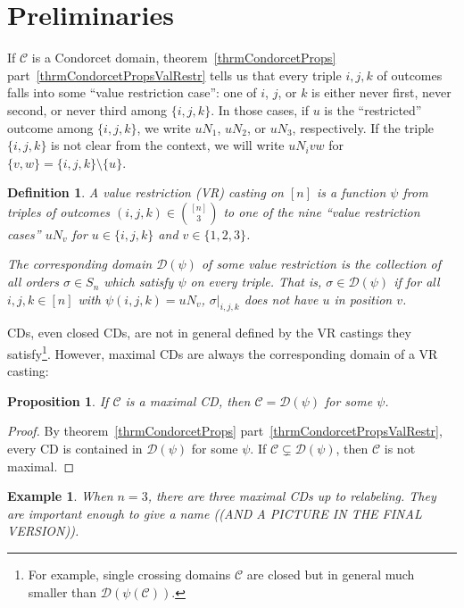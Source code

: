 \documentclass[12pt]{article}
\newtheorem{definition}[theorem]{Definition}
\newtheorem{example}[theorem]{Example}
\newtheorem{proposition}[theorem]{Proposition}
\newcommand{\C}{\mathcal{C}}
\newcommand{\D}{\mathcal{D}}
\newcommand{\1}[1]{\mathds{1}[{#1}]}
\begin{document}
\section{Preliminaries}

  If $\C$ is a Condorcet domain, theorem~\ref{thrmCondorcetProps}
  part~\ref{thrmCondorcetPropsValRestr} tells us that every triple $i,j,k$
  of outcomes falls into some ``value restriction case'':
  one of $i$, $j$, or $k$ is either
  never first, never second, or never third among $\{i,j,k\}$.
  In those cases, if $u$ is the ``restricted'' outcome among $\{i,j,k\}$,
  we write $u N_1$, $u N_2$, or $u N_3$, respectively.
  If the triple $\{i,j,k\}$ is not clear from the context, we will write
  $u N_i vw$ for $\{v,w\} = \{i,j,k\} \setminus \{u\}$.

  \begin{definition}
    A \emph{value restriction (VR) casting} on $[n]$ is a function
    $\psi$ from triples of outcomes $(i,j,k) \in {[n] \choose 3}$
    to one of the nine ``value restriction cases''
    $u N_v$ for $u\in\{i,j,k\}$ and $v\in \{1,2,3\}$.

    The \emph{corresponding domain} $\D(\psi)$ of some value restriction 
    is the collection of all orders $\sigma \in S_n$ which satisfy $\psi$ on
    every triple. That is, $\sigma\in\D(\psi)$ if for all $i,j,k \in [n]$ with
    $\psi(i,j,k) = u N_v$, $\sigma|_{i,j,k}$ does not have $u$ in position $v$.
  \end{definition}

  CDs, even closed CDs, are not in general defined
  by the VR castings they satisfy\footnote{
    For example, single crossing domains $\C$ are closed but 
    in general much smaller than $\D(\psi(\C))$.
  }. However, maximal CDs are always the corresponding domain
  of a VR casting:

  \begin{proposition}
    If $\C$ is a maximal CD, then $\C = \D(\psi)$ for some $\psi$.
  \end{proposition}
  \begin{proof}
    By theorem~\ref{thrmCondorcetProps} part~\ref{thrmCondorcetPropsValRestr},
    every CD is contained in $\D(\psi)$ for some $\psi$.
    If $\C\subsetneq \D(\psi)$, then $\C$ is not maximal.
  \end{proof}

  \begin{example}
    When $n=3$, there are three maximal CDs up to relabeling.
    They are important enough to give a name ((AND A PICTURE IN THE FINAL
    VERSION)).
  \end{example}
\end{document}
